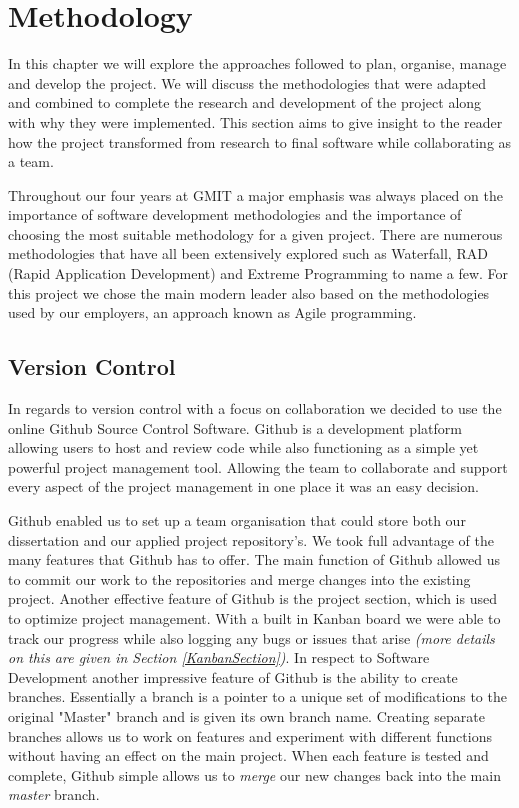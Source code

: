 \chapter{Methodology}
In this chapter we will explore the approaches followed to plan, organise, manage and develop the project. We will discuss the methodologies that were adapted and combined to complete the research and development of the project along with why they were implemented. This section aims to give insight to the reader how the project transformed from research to final software while collaborating as a team.

Throughout our four years at GMIT a major emphasis was always placed on the importance of software development methodologies and the importance of choosing the most suitable methodology for a given project. There are numerous  methodologies that have all been extensively explored such as Waterfall, RAD (Rapid Application Development) and Extreme Programming to name a few. For this project we chose the main modern leader also based on the methodologies used by our employers, an approach known as Agile programming.

\section{Version Control}
In regards to version control with a focus on collaboration we decided to use the online Github Source Control Software. Github is a development platform allowing users to host and review code while also functioning as a simple yet powerful project management tool. Allowing the team to collaborate and support every aspect of the project management in one place it was an easy decision. 

Github enabled us to set up a team organisation that could store both our dissertation and our applied project repository's. We took full advantage of the many features that Github has to offer. The main function of Github allowed us to commit our work to the repositories and merge changes into the existing project. Another effective feature of Github is the project section, which is used to optimize project management. With a built in Kanban board we were able to track our progress while also logging any bugs or issues that arise \textit{(more details on this are given in Section \ref{KanbanSection})}. In respect to Software Development another impressive feature of Github is the ability to create branches. Essentially a branch is a pointer to a unique set of modifications to the original "Master" branch and is given its own branch name. Creating separate branches allows us to work on features and experiment with different functions without having an effect on the main project. When each feature is tested and complete, Github simple allows us to \textit{merge} our new changes back into the main \textit{master} branch.

